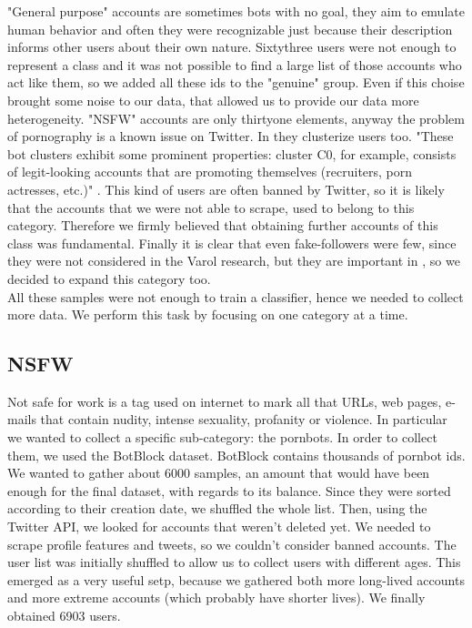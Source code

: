 "General purpose" accounts are sometimes bots with no goal, they aim to emulate human behavior and often they were recognizable just because their description informs other users about their own nature. 
Sixtythree users were not enough to represent a class and it was not possible to find a large list of those accounts who act like them, so we added all these ids to the "genuine" group. Even if this choise brought some noise to our data, that allowed us to provide our data more heterogeneity.
"NSFW" accounts are only thirtyone elements, anyway the problem of pornography is a known issue on Twitter. In \cite{Varol} they clusterize users too. "These bot clusters exhibit some prominent properties: cluster C0, for example, consists of legit-looking accounts that are promoting themselves (recruiters, porn actresses, etc.)" \cite{Varol}.
This kind of users are often banned by Twitter, so it is likely that the accounts that we were not able to scrape, used to belong to this category.
Therefore we firmly believed that obtaining further accounts of this class was fundamental.
Finally it is clear that even fake-followers were few, since they were not considered in the Varol research, but they are important in \cite{Cresci}, so we decided to expand this category too.\\
All these samples were not enough to train a classifier, hence we needed to collect more data. We perform this task by focusing on one category at a time.

\subsection{NSFW}
Not safe for work is a tag used on internet to mark all that URLs, web pages, e-mails that contain nudity, intense sexuality, profanity or violence. In particular we wanted to collect a specific sub-category: the pornbots. In order to collect them, we used the BotBlock dataset.
BotBlock contains thousands of pornbot ids. We wanted to gather about 6000 samples, an amount that would have been enough for the final dataset, with regards to its balance.
Since they were sorted according to their creation date, we shuffled the whole list. Then, using the Twitter API, we looked for accounts that weren't deleted yet. 
We needed to scrape profile features and tweets, so we couldn't consider banned accounts. The user list was initially shuffled to allow us to collect users with different ages. This emerged as a very useful setp, because we gathered both more long-lived accounts and more extreme accounts (which probably have shorter lives).
We finally obtained 6903 users.
